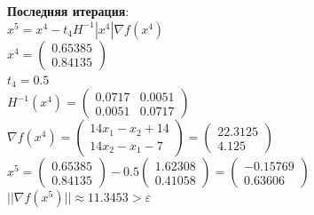 \textbf{Последняя итерация}:\\
$x^{5} = x^{4} - t_{4}H^{-1}|x^{4}| \nabla f(x^{4})$\\
$x^{4} = 
\begin{pmatrix}
  0.65385\\
  0.84135
\end{pmatrix}
$\\

$t_{4} = 0.5$\\
$ %
H^{-1}(x^{4}) = 
\begin{pmatrix}
  0.0717 & 0.0051\\
  0.0051 & 0.0717
\end{pmatrix}
$\\

$
\nabla f(x^{4}) = 
\begin{pmatrix}
  14x_{1} - x_{2} + 14\\
  14x_{2} - x_{1} - 7
\end{pmatrix}
=
\begin{pmatrix}
  22.3125\\
  4.125
\end{pmatrix}
$\\

$
x^{5} = 
\begin{pmatrix}
  0.65385\\
  0.84135
\end{pmatrix}
-
0.5
\begin{pmatrix}
  1.62308\\
  0.41058
\end{pmatrix}
=
\begin{pmatrix}
  -0.15769\\
  0.63606
\end{pmatrix}
$\\

$||\nabla f(x^{5})|| \approx 11.3453 > \varepsilon$

\pagebreak
